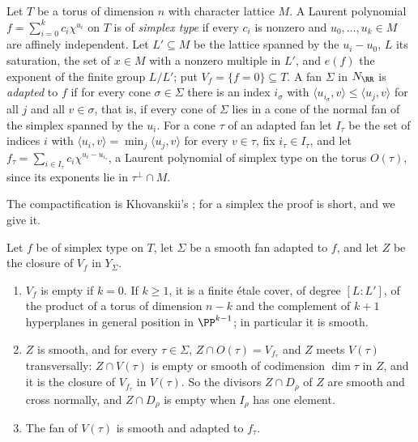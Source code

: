 \begin{definition}\label{def:simplextype}
Let $T$ be a torus of dimension $n$ with character lattice $M$. A Laurent
polynomial $f=\sum_{i=0}^{k}c_{i}\chi^{u_{i}}$ on $T$ is of \emph{simplex
type} if every $c_{i}$ is nonzero and $u_{0},\dots,u_{k}\in M$ are affinely
independent. Let $L'\subseteq M$ be the lattice spanned by the
$u_{i}-u_{0}$, $L$ its saturation, the set of $x\in M$ with a nonzero
multiple in $L'$, and $e(f)$ the exponent of the finite group $L/L'$; put
$V_{f}=\{f=0\}\subseteq T$. A fan $\Sigma$ in $N_{\RR}$ is \emph{adapted} to
$f$ if for every cone $\sigma\in\Sigma$ there is an index $i_{\sigma}$ with
$\langle u_{i_{\sigma}},v\rangle\le\langle u_{j},v\rangle$ for all $j$ and
all $v\in\sigma$, that is, if every cone of $\Sigma$ lies in a cone of the
normal fan of the simplex spanned by the $u_{i}$. For a cone $\tau$ of an
adapted fan let $I_{\tau}$ be the set of indices $i$ with
$\langle u_{i},v\rangle=\min_{j}\langle u_{j},v\rangle$ for every
$v\in\tau$, fix $i_{\tau}\in I_{\tau}$, and let
$f_{\tau}=\sum_{i\in I_{\tau}}c_{i}\chi^{u_{i}-u_{i_{\tau}}}$, a Laurent
polynomial of simplex type on the torus $O(\tau)$, since its exponents lie
in $\tau^{\perp}\cap M$.
\end{definition}

The compactification is Khovanskii's \cite{Kho77}; for a simplex the proof
is short, and we give it.

\begin{lemma}\label{lem:simplexchart}
Let $f$ be of simplex type on $T$, let $\Sigma$ be a smooth fan adapted to
$f$, and let $Z$ be the closure of $V_{f}$ in $Y_{\Sigma}$.
\begin{enumerate}[label=\textup{(\roman*)},leftmargin=2.6em,itemsep=2pt]
\item $V_{f}$ is empty if $k=0$. If $k\ge1$, it is a finite \'etale cover,
  of degree $[L:L']$, of the product of a torus of dimension $n-k$ and the
  complement of $k+1$ hyperplanes in general position in $\PP^{k-1}$; in
  particular it is smooth.
\item $Z$ is smooth, and for every $\tau\in\Sigma$, $Z\cap O(\tau)=V_{f_{\tau}}$
  and $Z$ meets $V(\tau)$ transversally: $Z\cap V(\tau)$ is empty or smooth of
  codimension $\dim\tau$ in $Z$, and it is the closure of $V_{f_{\tau}}$ in
  $V(\tau)$. So the divisors $Z\cap D_{\rho}$ of $Z$ are smooth and cross
  normally, and $Z\cap D_{\rho}$ is empty when $I_{\rho}$ has one element.
\item The fan of $V(\tau)$ is smooth and adapted to $f_{\tau}$.
\end{enumerate}
\end{lemma}

